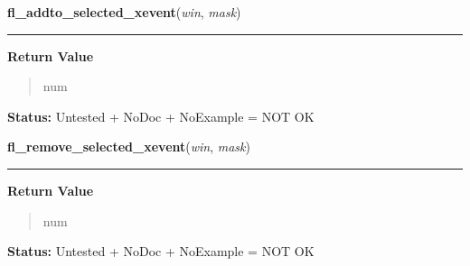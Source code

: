 \hspace{.8\funcindent}\begin{boxedminipage}{\funcwidth}

    \raggedright \textbf{fl\_addto\_selected\_xevent}(\textit{win}, \textit{mask})

    \vspace{-1.5ex}

    \rule{\textwidth}{0.5\fboxrule}
\setlength{\parskip}{2ex}
\setlength{\parskip}{1ex}
      \textbf{Return Value}
    \vspace{-1ex}

      \begin{quote}
      num

      \end{quote}

\textbf{Status:} Untested + NoDoc + NoExample = NOT OK



    \end{boxedminipage}

    \label{xformslib:library:fl_remove_selected_xevent}

    \vspace{0.5ex}

\hspace{.8\funcindent}\begin{boxedminipage}{\funcwidth}

    \raggedright \textbf{fl\_remove\_selected\_xevent}(\textit{win}, \textit{mask})

    \vspace{-1.5ex}

    \rule{\textwidth}{0.5\fboxrule}
\setlength{\parskip}{2ex}
\setlength{\parskip}{1ex}
      \textbf{Return Value}
    \vspace{-1ex}

      \begin{quote}
      num

      \end{quote}

\textbf{Status:} Untested + NoDoc + NoExample = NOT OK



    \end{boxedminipage}

    \label{xformslib:library:fl_addto_selected_xevent}

